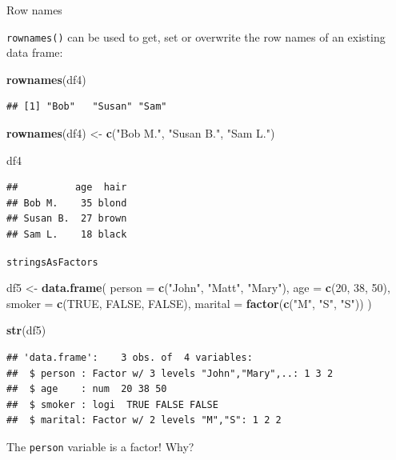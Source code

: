 \documentclass[ignorenonframetext,]{beamer}
\newenvironment{Shaded}{\begin{snugshade}}{\end{snugshade}}
\newcommand{\DataTypeTok}[1]{\textcolor[rgb]{0.13,0.29,0.53}{#1}}
\newcommand{\DecValTok}[1]{\textcolor[rgb]{0.00,0.00,0.81}{#1}}
\newcommand{\KeywordTok}[1]{\textcolor[rgb]{0.13,0.29,0.53}{\textbf{#1}}}
\newcommand{\NormalTok}[1]{#1}
\newcommand{\OtherTok}[1]{\textcolor[rgb]{0.56,0.35,0.01}{#1}}
\newcommand{\StringTok}[1]{\textcolor[rgb]{0.31,0.60,0.02}{#1}}
\begin{document}
\begin{frame}[fragile]{Row names}
\protect\hypertarget{row-names-1}{}

\texttt{rownames()} can be used to get, set or overwrite the row names
of an existing data frame:

\begin{Shaded}
\begin{Highlighting}[]
\KeywordTok{rownames}\NormalTok{(df4)}
\end{Highlighting}
\end{Shaded}

\begin{verbatim}
## [1] "Bob"   "Susan" "Sam"
\end{verbatim}

\begin{Shaded}
\begin{Highlighting}[]
\KeywordTok{rownames}\NormalTok{(df4) <-}\StringTok{ }\KeywordTok{c}\NormalTok{(}\StringTok{"Bob M."}\NormalTok{, }\StringTok{"Susan B."}\NormalTok{, }\StringTok{"Sam L."}\NormalTok{) }

\NormalTok{df4}
\end{Highlighting}
\end{Shaded}

\begin{verbatim}
##          age  hair
## Bob M.    35 blond
## Susan B.  27 brown
## Sam L.    18 black
\end{verbatim}

\end{frame}

\begin{frame}[fragile]{\texttt{stringsAsFactors}}
\protect\hypertarget{stringsasfactors}{}

\begin{Shaded}
\begin{Highlighting}[]
\NormalTok{df5 <-}\StringTok{ }\KeywordTok{data.frame}\NormalTok{(}
  \DataTypeTok{person =} \KeywordTok{c}\NormalTok{(}\StringTok{"John"}\NormalTok{, }\StringTok{"Matt"}\NormalTok{, }\StringTok{"Mary"}\NormalTok{),}
  \DataTypeTok{age =} \KeywordTok{c}\NormalTok{(}\DecValTok{20}\NormalTok{, }\DecValTok{38}\NormalTok{, }\DecValTok{50}\NormalTok{),}
  \DataTypeTok{smoker =} \KeywordTok{c}\NormalTok{(}\OtherTok{TRUE}\NormalTok{, }\OtherTok{FALSE}\NormalTok{, }\OtherTok{FALSE}\NormalTok{),}
  \DataTypeTok{marital =} \KeywordTok{factor}\NormalTok{(}\KeywordTok{c}\NormalTok{(}\StringTok{"M"}\NormalTok{, }\StringTok{"S"}\NormalTok{, }\StringTok{"S"}\NormalTok{))}
\NormalTok{)}

\KeywordTok{str}\NormalTok{(df5)}
\end{Highlighting}
\end{Shaded}

\begin{verbatim}
## 'data.frame':    3 obs. of  4 variables:
##  $ person : Factor w/ 3 levels "John","Mary",..: 1 3 2
##  $ age    : num  20 38 50
##  $ smoker : logi  TRUE FALSE FALSE
##  $ marital: Factor w/ 2 levels "M","S": 1 2 2
\end{verbatim}

The \texttt{person} variable is a factor! Why?

\end{frame}
\end{document}
